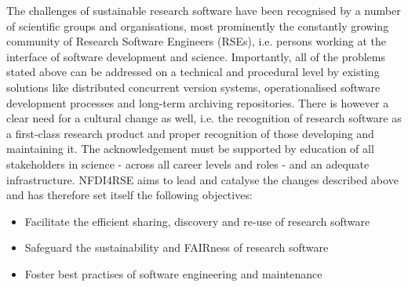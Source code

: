 \documentclass[11pt,a4paper,DIV=11]{scrlttr2}
\begin{document}
\begin{letter}{}
The challenges of sustainable research software have been recognised by a number of scientific groups and organisations, most prominently the constantly growing community of Research Software Engineers (RSEs), i.e. persons working at the interface of software development and science. Importantly, all of the problems stated above can be addressed on a technical and procedural level by existing solutions like distributed concurrent version systems, operationalised software development processes and long-term archiving repositories. There is however a clear need for a cultural change as well, i.e. the recognition of research software as a first-class research product and proper recognition of those developing and maintaining it. The acknowledgement must be supported by education of all stakeholders in science - across all career levels and roles - and an adequate infrastructure.
\clearpage
NFDI4RSE aims to lead and catalyse the changes described above and has therefore set itself the following objectives:
\begin{itemize}
 \item Facilitate the efficient sharing, discovery and re-use of research software
 \item Safeguard the sustainability and FAIRness of research software
 \item Foster best practises of software engineering and maintenance
\end{itemize}


\end{letter}
\end{document}
